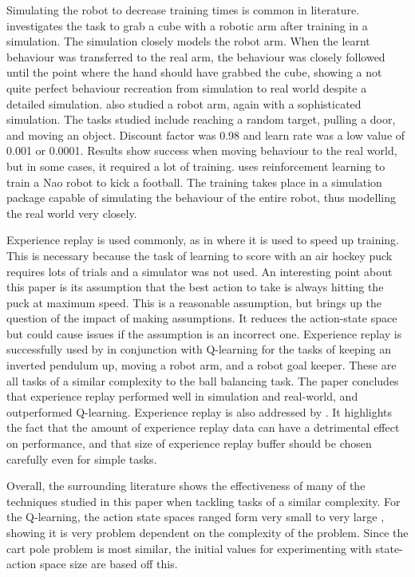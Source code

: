 \documentclass[12pt,a4paper]{article}
\begin{document}
Simulating the robot to decrease training times is common in literature. \cite{sim_robot_arm} investigates the task to grab a cube with a robotic arm after training in a simulation. The simulation closely models the robot arm. When the learnt behaviour was transferred to the real arm, the behaviour was closely followed until the point where the hand should have grabbed the cube, showing a not quite perfect behaviour recreation from simulation to real world despite a detailed simulation. \cite{arm_sim_door} also studied a robot arm, again with a sophisticated simulation. The tasks studied include reaching a random target, pulling a door, and moving an object. Discount factor was 0.98 and learn rate was a low value of 0.001 or 0.0001. Results show success when moving behaviour to the real world, but in some cases, it required a lot of training. \cite{nao_football} uses reinforcement learning to train a Nao robot to kick a football. The training takes place in a simulation package capable of simulating the behaviour of the entire robot, thus modelling the real world very closely. 

Experience replay is used commonly, as in \cite{air_hockey} where it is used to speed up training. This is necessary because the task of learning to score with an air hockey puck requires lots of trials and a simulator was not used. An interesting point about this paper is its assumption that the best action to take is always hitting the puck at maximum speed. This is a reasonable assumption, but brings up the question of the impact of making assumptions. It reduces the action-state space but could cause issues if the assumption is an incorrect one. Experience replay is successfully used by \cite{er} in conjunction with Q-learning for the tasks of keeping an inverted pendulum up, moving a robot arm, and a robot goal keeper. These are all tasks of a similar complexity to the ball balancing task. The paper concludes that experience replay performed well in simulation and real-world, and outperformed Q-learning. Experience replay is also addressed by \cite{er_deeper}. It highlights the fact that the amount of experience replay data can have a detrimental effect on performance, and that size of experience replay buffer should be chosen carefully even for simple tasks.

Overall, the surrounding literature shows the effectiveness of many of the techniques studied in this paper when tackling tasks of a similar complexity. For the Q-learning, the action state spaces ranged form very small \cite{cart_pole_webpage} to very large \cite{nao_balance}, showing it is very problem dependent on the complexity of the problem. Since the cart pole problem is most similar, the initial values for experimenting with state-action space size are based off this.
\end{document}

